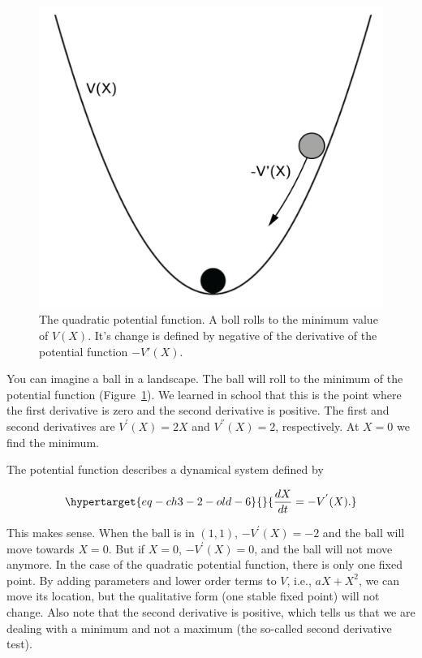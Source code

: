 \documentclass[
  a4paper,
  DIV=11,
  numbers=noendperiod,
  oneside]{scrreprt}
\begin{document}
\begin{figure}

{\centering \includegraphics{media/ch3/ch3-03__figure15.png}

}

\caption{\label{fig-ch3-img3-old-15}The quadratic potential function. A
boll rolls to the minimum value of \(V(X)\). It's change is defined by
negative of the derivative of the potential function \(-V'(X)\).}

\end{figure}

You can imagine a ball in a landscape. The ball will roll to the minimum
of the potential function (Figure~\ref{fig-ch3-img3-old-15}). We learned
in school that this is the point where the first derivative is zero and
the second derivative is positive. The first and second derivatives are
\(V^{'}(X) = 2X\) and \(V^{''}(X) = 2\), respectively. At \(X = 0\) we
find the minimum.

The potential function describes a dynamical system defined by

\begin{equation}\protect\hypertarget{eq-ch3-2-old-6}{}{
\frac{dX}{dt} = - V^{'}(X).
}\label{eq-ch3-2-old-6}\end{equation}

This makes sense. When the ball is in \((1,1)\), \(- V^{'}(X) = - 2\)
and the ball will move towards \(X = 0\). But if \(X = 0\),
\(- V^{'}(X) = 0\), and the ball will not move anymore. In the case of
the quadratic potential function, there is only one fixed point. By
adding parameters and lower order terms to \(V\), i.e.,
\({aX + X}^{2}\), we can move its location, but the qualitative form
(one stable fixed point) will not change. Also note that the second
derivative is positive, which tells us that we are dealing with a
minimum and not a maximum (the so-called second derivative test).
\end{document}
